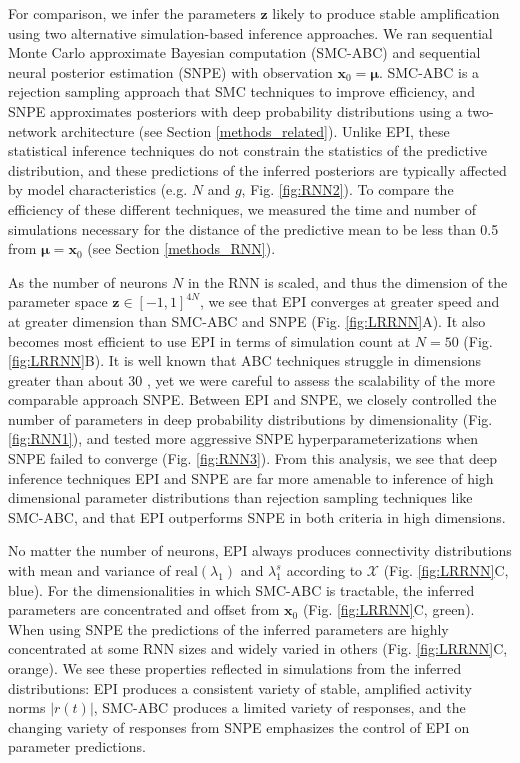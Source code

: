 \documentclass[11pt]{article}
\begin{document}
For comparison, we infer the parameters $\mathbf{z}$ likely to produce stable amplification using two alternative simulation-based inference approaches.
We ran sequential Monte Carlo approximate Bayesian computation (SMC-ABC) \cite{sisson2007sequential} and sequential neural posterior estimation (SNPE) \cite{gonccalves2019training} with observation $\mathbf{x}_0 = \bm{\mu}$.
SMC-ABC is a rejection sampling approach that SMC techniques to improve efficiency, and SNPE approximates posteriors with deep probability distributions using a two-network architecture (see Section \ref{methods_related}).
Unlike EPI, these statistical inference techniques do not constrain the statistics of the predictive distribution, and these predictions of the inferred posteriors are typically affected by model characteristics (e.g. $N$ and $g$, Fig. \ref{fig:RNN2}).
To compare the efficiency of these different techniques, we measured the time and number of simulations necessary for the distance of the predictive mean to be less than 0.5 from $\bm{\mu} = \mathbf{x}_0$ (see Section \ref{methods_RNN}).

As the number of neurons $N$ in the RNN is scaled, and thus the dimension of the parameter space $\mathbf{z} \in [-1, 1]^{4N}$, we see that EPI converges at greater speed and at greater dimension than SMC-ABC and SNPE (Fig. \ref{fig:LRRNN}A).
It also becomes most efficient to use EPI in terms of simulation count at $N=50$ (Fig. \ref{fig:LRRNN}B).
It is well known that ABC techniques struggle in dimensions greater than about 30 \cite{sisson2018handbook}, yet we were careful to assess the scalability of the more comparable approach SNPE.
Between EPI and SNPE, we closely controlled the number of parameters in deep probability distributions by dimensionality (Fig. \ref{fig:RNN1}), and tested more aggressive SNPE hyperparameterizations when SNPE failed to converge (Fig. \ref{fig:RNN3}).
From this analysis, we see that deep inference techniques EPI and SNPE are far more amenable to inference of high dimensional parameter distributions than rejection sampling techniques like SMC-ABC, and that EPI outperforms SNPE in both criteria in high dimensions.

No matter the number of neurons, EPI always produces connectivity distributions with mean and variance of $\text{real}(\lambda_1)$ and $\lambda_1^s$ according to $\mathcal{X}$ (Fig. \ref{fig:LRRNN}C, blue).
For the dimensionalities in which SMC-ABC is tractable, the inferred parameters are concentrated and offset from $\mathbf{x}_0$ (Fig. \ref{fig:LRRNN}C, green).
When using SNPE the predictions of the inferred parameters are highly concentrated at some RNN sizes and widely varied in others (Fig. \ref{fig:LRRNN}C, orange).
We see these properties reflected in simulations from the inferred distributions: EPI produces a consistent variety of stable, amplified activity norms $|r(t)|$, SMC-ABC produces a limited variety of responses, and the changing variety of responses from SNPE emphasizes the control of EPI on parameter predictions.
\end{document}
